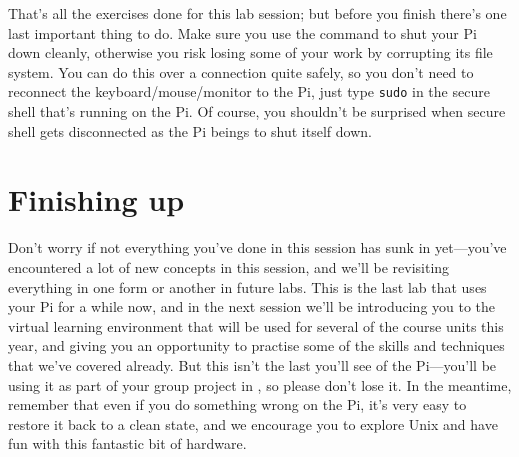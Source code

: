 That's all the exercises done for this lab session; but before you finish  there's one last important thing to do. Make sure you use the  command to shut your Pi down cleanly, otherwise you risk losing some of your work by corrupting its file system. You can do this over a  connection quite safely, so you don't need to reconnect the keyboard/mouse/monitor to the Pi, just type \texttt{sudo}  in the secure shell that's running on the Pi. Of course, you shouldn't be surprised when secure shell gets disconnected as the Pi beings to shut itself down.

\section{Finishing up}
Don't worry if not everything you've done in this session has sunk in yet---you've encountered a lot of new concepts in this session, and we'll be revisiting everything in one form or another in future labs. This is the last lab that uses your Pi for a while now, and in the next session we'll be introducing you to the virtual learning environment that will be used for several of the course units this year, and giving you an opportunity to practise some of the skills and techniques that we've covered already. But this isn't the last you'll see of the Pi---you'll be using it as part of your group project in , so please don't lose it. In the meantime, remember that even if you do something wrong on the Pi, it's very easy to restore it back to a clean state, and we encourage you to explore Unix and have fun with this fantastic bit of hardware.

